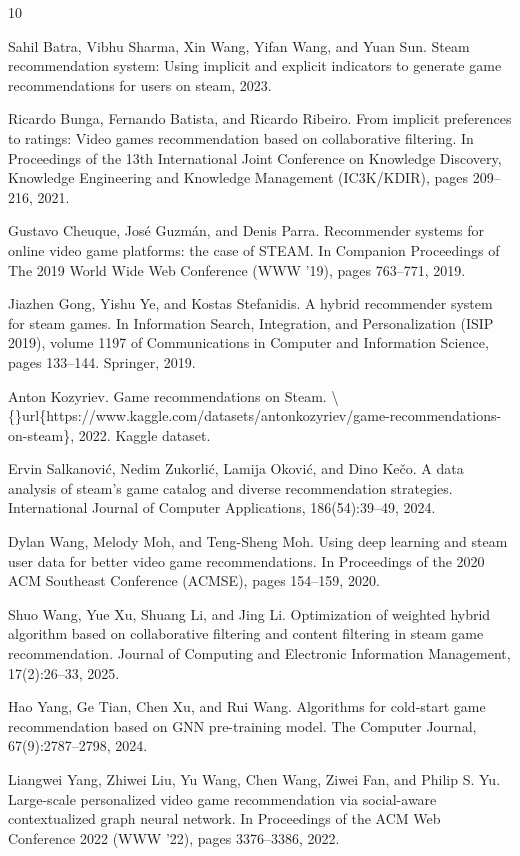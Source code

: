 \documentclass[conference]{IEEEtran}
\begin{document}
\begin{thebibliography}{10}

 Sahil Batra, Vibhu Sharma, Xin Wang, Yifan Wang, and Yuan Sun. Steam recommendation system: Using implicit and explicit indicators to generate game recommendations for users on steam, 2023.

 Ricardo Bunga, Fernando Batista, and Ricardo Ribeiro. From implicit preferences to ratings: Video games recommendation based on collaborative filtering. In Proceedings of the 13th International Joint Conference on Knowledge Discovery, Knowledge Engineering and Knowledge Management (IC3K/KDIR), pages 209--216, 2021.

 Gustavo Cheuque, José Guzmán, and Denis Parra. Recommender systems for online video game platforms: the case of STEAM. In Companion Proceedings of The 2019 World Wide Web Conference (WWW '19), pages 763--771, 2019.

 Jiazhen Gong, Yishu Ye, and Kostas Stefanidis. A hybrid recommender system for steam games. In Information Search, Integration, and Personalization (ISIP 2019), volume 1197 of Communications in Computer and Information Science, pages 133--144. Springer, 2019.

 Anton Kozyriev. Game recommendations on Steam. \textbackslash\{\}url\{https://www.kaggle.com/datasets/antonkozyriev/game-recommendations-on-steam\}, 2022. Kaggle dataset.

 Ervin Salkanović, Nedim Zukorlić, Lamija Oković, and Dino Kečo. A data analysis of steam's game catalog and diverse recommendation strategies. International Journal of Computer Applications, 186(54):39--49, 2024.

 Dylan Wang, Melody Moh, and Teng-Sheng Moh. Using deep learning and steam user data for better video game recommendations. In Proceedings of the 2020 ACM Southeast Conference (ACMSE), pages 154--159, 2020.

 Shuo Wang, Yue Xu, Shuang Li, and Jing Li. Optimization of weighted hybrid algorithm based on collaborative filtering and content filtering in steam game recommendation. Journal of Computing and Electronic Information Management, 17(2):26--33, 2025.

 Hao Yang, Ge Tian, Chen Xu, and Rui Wang. Algorithms for cold-start game recommendation based on GNN pre-training model. The Computer Journal, 67(9):2787--2798, 2024.

 Liangwei Yang, Zhiwei Liu, Yu Wang, Chen Wang, Ziwei Fan, and Philip S. Yu. Large-scale personalized video game recommendation via social-aware contextualized graph neural network. In Proceedings of the ACM Web Conference 2022 (WWW '22), pages 3376--3386, 2022.

\end{thebibliography}
\end{document}
